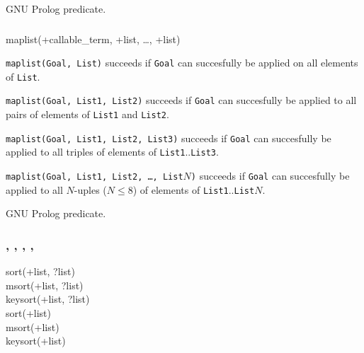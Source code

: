 \PlErrorsNone

\Portability

GNU Prolog predicate.

\subsubsection{}

\begin{TemplatesOneCol}
maplist(+callable\_term, +list, \ldots, +list)

\end{TemplatesOneCol}

\Description

\texttt{maplist(Goal, List)} succeeds if \texttt{Goal} can succesfully be
applied on all elements of \texttt{List}.

\texttt{maplist(Goal, List1, List2)} succeeds if \texttt{Goal} can succesfully be
applied to all pairs of elements of \texttt{List1} and \texttt{List2}.

\texttt{maplist(Goal, List1, List2, List3)} succeeds if \texttt{Goal} can succesfully be
applied to all triples of elements of \texttt{List1}..\texttt{List3}.

\texttt{maplist(Goal, List1, List2, \ldots, List$N$)} succeeds if \texttt{Goal} can succesfully be
applied to all $N$-uples ($N \leq 8$) of elements of \texttt{List1}..\texttt{List$N$}.

\begin{PlErrors}


\end{PlErrors}

\Portability

GNU Prolog predicate.

\subsubsection{,\label{sort/2}
               ,
               ,
               ,
               }


\begin{TemplatesOneCol}
sort(+list, ?list)\\
msort(+list, ?list)\\
keysort(+list, ?list)\\
sort(+list)\\
msort(+list)\\
keysort(+list)

\end{TemplatesOneCol}

